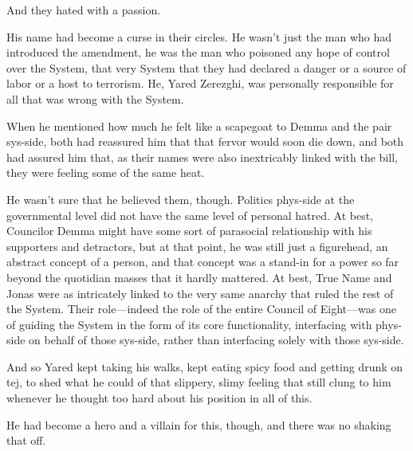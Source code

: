 And they hated with a passion.

His name had become a curse in their circles. He wasn't just the man who had introduced the amendment, he was the man who poisoned any hope of control over the System, that very System that they had declared a danger or a source of labor or a host to terrorism. He, Yared Zerezghi, was personally responsible for all that was wrong with the System.

When he mentioned how much he felt like a scapegoat to Demma and the pair sys-side, both had reassured him that that fervor would soon die down, and both had assured him that, as their names were also inextricably linked with the bill, they were feeling some of the same heat.

He wasn't sure that he believed them, though. Politics phys-side at the governmental level did not have the same level of personal hatred. At best, Councilor Demma might have some sort of parasocial relationship with his supporters and detractors, but at that point, he was still just a figurehead, an abstract concept of a person, and that concept was a stand-in for a power so far beyond the quotidian masses that it hardly mattered. At best, True Name and Jonas were as intricately linked to the very same anarchy that ruled the rest of the System. Their role---indeed the role of the entire Council of Eight---was one of guiding the System in the form of its core functionality, interfacing with phys-side on behalf of those sys-side, rather than interfacing solely with those sys-side.

And so Yared kept taking his walks, kept eating spicy food and getting drunk on tej, to shed what he could of that slippery, slimy feeling that still clung to him whenever he thought too hard about his position in all of this.

He had become a hero and a villain for this, though, and there was no shaking that off.

